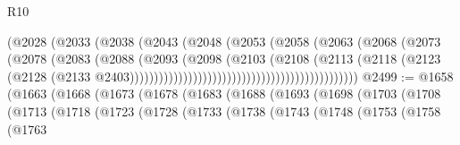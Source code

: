\begin{lexlean}{R10}
\begin{coremodule}
                                                      (@2028
                                                        (@2033
                                                          (@2038
                                                            (@2043
                                                              (@2048
                                                                (@2053
                                                                  (@2058
                                                                    (@2063
                                                                      (@2068
                                                                        (@2073
                                                                          (@2078
                                                                            (@2083
                                                                              (@2088
                                                                                (@2093
                                                                                  (@2098
                                                                                    (@2103
                                                                                      (@2108
                                                                                        (@2113
                                                                                          (@2118
                                                                                            (@2123
                                                                                              (@2128
                                                                                                (@2133
                                                                                                  @2403)))))))))))))))))))))))))))))))))))))))))))))))
@2499 := @1658
    (@1663
      (@1668
        (@1673
          (@1678
            (@1683
              (@1688
                (@1693
                  (@1698
                    (@1703
                      (@1708
                        (@1713
                          (@1718
                            (@1723
                              (@1728
                                (@1733
                                  (@1738
                                    (@1743
                                      (@1748
                                        (@1753
                                          (@1758
                                            (@1763

\end{coremodule}
\end{lexlean}
